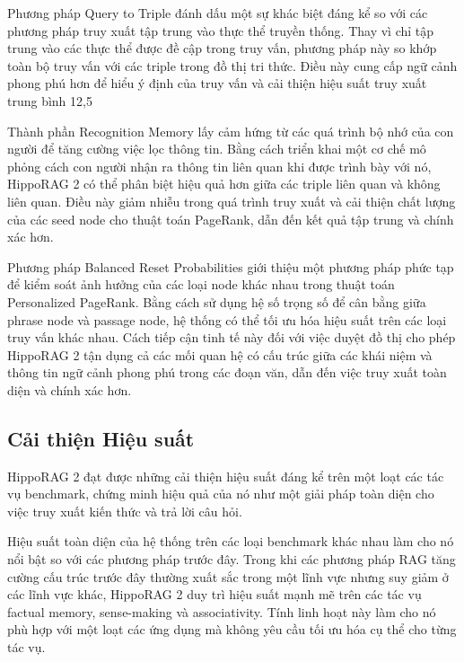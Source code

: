 \documentclass[../main.tex]{subfiles}
\begin{document}
Phương pháp Query to Triple đánh dấu một sự khác biệt đáng kể so với các phương pháp truy xuất tập trung vào thực thể truyền thống. Thay vì chỉ tập trung vào các thực thể được đề cập trong truy vấn, phương pháp này so khớp toàn bộ truy vấn với các triple trong đồ thị tri thức. Điều này cung cấp ngữ cảnh phong phú hơn để hiểu ý định của truy vấn và cải thiện hiệu suất truy xuất trung bình 12,5%

Thành phần Recognition Memory lấy cảm hứng từ các quá trình bộ nhớ của con người để tăng cường việc lọc thông tin. Bằng cách triển khai một cơ chế mô phỏng cách con người nhận ra thông tin liên quan khi được trình bày với nó, HippoRAG 2 có thể phân biệt hiệu quả hơn giữa các triple liên quan và không liên quan. Điều này giảm nhiễu trong quá trình truy xuất và cải thiện chất lượng của các seed node cho thuật toán PageRank, dẫn đến kết quả tập trung và chính xác hơn.

Phương pháp Balanced Reset Probabilities giới thiệu một phương pháp phức tạp để kiểm soát ảnh hưởng của các loại node khác nhau trong thuật toán Personalized PageRank. Bằng cách sử dụng hệ số trọng số để cân bằng giữa phrase node và passage node, hệ thống có thể tối ưu hóa hiệu suất trên các loại truy vấn khác nhau. Cách tiếp cận tinh tế này đối với việc duyệt đồ thị cho phép HippoRAG 2 tận dụng cả các mối quan hệ có cấu trúc giữa các khái niệm và thông tin ngữ cảnh phong phú trong các đoạn văn, dẫn đến việc truy xuất toàn diện và chính xác hơn.

\subsection{Cải thiện Hiệu suất}
HippoRAG 2 đạt được những cải thiện hiệu suất đáng kể trên một loạt các tác vụ benchmark, chứng minh hiệu quả của nó như một giải pháp toàn diện cho việc truy xuất kiến thức và trả lời câu hỏi.

Hiệu suất toàn diện của hệ thống trên các loại benchmark khác nhau làm cho nó nổi bật so với các phương pháp trước đây. Trong khi các phương pháp RAG tăng cường cấu trúc trước đây thường xuất sắc trong một lĩnh vực nhưng suy giảm ở các lĩnh vực khác, HippoRAG 2 duy trì hiệu suất mạnh mẽ trên các tác vụ factual memory, sense-making và associativity. Tính linh hoạt này làm cho nó phù hợp với một loạt các ứng dụng mà không yêu cầu tối ưu hóa cụ thể cho từng tác vụ.
\end{document}
